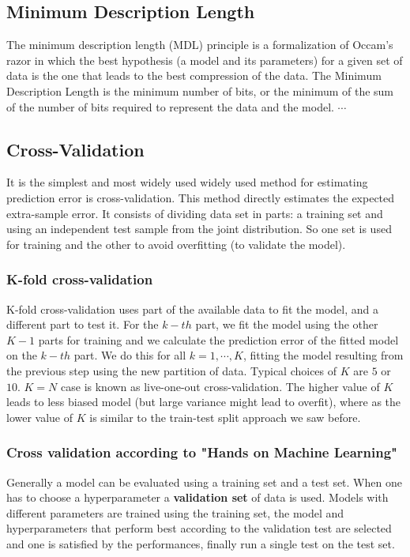 \documentclass[12pt, letterpaper]{article}
\theoremstyle{definition}
\begin{document}
\subsection{Minimum Description Length}
The minimum description length (MDL) principle is a formalization of Occam's razor in which the best hypothesis (a model and its parameters) for a given set of data is the one that leads to the best compression of the data.
The Minimum Description Length is the minimum number of bits, or the minimum of the sum of the number of bits required to represent the data and the model.
$\cdots$

\subsection{Cross-Validation}
It is the simplest and most widely used widely used method for estimating prediction error is cross-validation. This method directly estimates the expected extra-sample error. It consists of dividing data set  in parts: a training set and using an independent test sample from the joint distribution. So one set is used for training and the other to avoid overfitting (to validate the model).

\subsubsection{K-fold cross-validation}
K-fold cross-validation uses part of the available data to fit the model, and a different part to test it.
For the $k-th$ part, we fit the model using the other $K-1$ parts for training and we calculate the prediction error of the fitted model on the $k-th$ part. We do this for all $k=1,\cdots, K$, fitting the model resulting from the previous step using the new partition of data.
Typical choices of $K$ are $5$ or $10$. $K=N$ case is known as live-one-out cross-validation. The higher value of $K$ leads to less biased model (but large variance might lead to overfit), where as the lower value of $K$ is similar to the train-test split approach we saw before.

\subsubsection{Cross validation according to "Hands on Machine Learning"}
Generally a model can be evaluated using a training set and a test set. When one has to choose a hyperparameter a \textbf{validation set} of data is used. Models with different parameters are trained using the training set, the model and hyperparameters that perform best according to the validation test are selected and one is satisfied by the performances, finally run a single test on the test set. 
\end{document}
